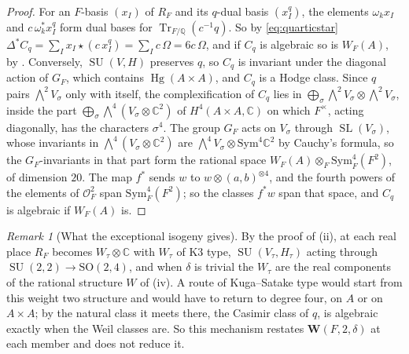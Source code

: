 \documentclass[11pt,reqno]{amsart}
\theoremstyle{plain}
\theoremstyle{definition}
\theoremstyle{remark}
\newtheorem{remark}[theorem]{Remark}
\newcommand{\QQ}{\mathbb{Q}}
\newcommand{\CC}{\mathbb{C}}
\newcommand{\cO}{\mathcal{O}}
\DeclareMathOperator{\Hg}{Hg}
\DeclareMathOperator{\Tr}{Tr}
\DeclareMathOperator{\SL}{SL}
\DeclareMathOperator{\SU}{SU}
\begin{document}
\begin{proof}
For an $F$-basis $(x_{I})$ of $R_{F}$ and its $q$-dual basis $(x_{I}^{q})$, the
elements $\omega_{k}x_{I}$ and $c\,\omega_{k}^{*}x_{I}^{q}$ form dual bases for
$\Tr_{F/\QQ}(c^{-1}q)$. So by \eqref{eq:quarticstar}
$\Delta^{*}C_{q}=\sum_{I}x_{I}\star(c\,x_{I}^{q})=\sum_{I}c\,\Omega=6c\,\Omega$,
and if $C_{q}$ is algebraic so is $W_{F}(A)$, by \cite[Proposition~17.3(ii)]{paperI}.
Conversely, $\SU(V,H)$ preserves $q$, so $C_{q}$ is invariant under the
diagonal action of $G_{F}$, which contains $\Hg(A\times A)$, and $C_{q}$ is a
Hodge class. Since $q$ pairs $\bigwedge^{2}V_{\sigma}$ only with itself, the
complexification of $C_{q}$ lies in $\bigoplus_{\sigma}\bigwedge^{2}V_{\sigma}
\otimes\bigwedge^{2}V_{\sigma}$, inside the part
$\bigoplus_{\sigma}\bigwedge^{4}(V_{\sigma}\otimes\CC^{2})$ of
$H^{4}(A\times A,\CC)$ on which $F^{\times}$, acting diagonally, has the
characters $\sigma^{4}$. The group $G_{F}$ acts on $V_{\sigma}$ through
$\SL(V_{\sigma})$, whose invariants in $\bigwedge^{4}(V_{\sigma}\otimes\CC^{2})$
are $\bigwedge^{4}V_{\sigma}\otimes\mathrm{Sym}^{4}\CC^{2}$ by Cauchy's
formula, so the $G_{F}$-invariants in that part form the rational space
$W_{F}(A)\otimes_{F}\mathrm{Sym}^{4}_{F}(F^{2})$, of dimension $20$. The map
$f^{*}$ sends $w$ to $w\otimes(a,b)^{\otimes4}$, and the fourth powers of the
elements of $\cO_{F}^{2}$ span $\mathrm{Sym}^{4}_{F}(F^{2})$; so the classes
$f^{*}w$ span that space, and $C_{q}$ is algebraic if $W_{F}(A)$ is.
\end{proof}

\begin{remark}[What the exceptional isogeny gives]\label{rem:quarticisogeny}
By the proof of (ii), at each real place $R_{F}$ becomes
$W_{\tau}\otimes\CC$ with $W_{\tau}$ of K3 type, $\SU(V_{\tau},H_{\tau})$ acting
through $\SU(2,2)\to\mathrm{SO}(2,4)$, and when $\delta$ is trivial the
$W_{\tau}$ are the real components of the rational structure $W$ of
(iv). A route of Kuga--Satake type would start from
this weight two structure and would have to return to degree four, on $A$ or
on $A\times A$; by  the natural class it meets
there, the Casimir class of $q$, is algebraic exactly when the Weil classes
are. So this mechanism restates $\mathbf{W}(F,2,\delta)$ at each member and
does not reduce it.
\end{remark}
\end{document}
